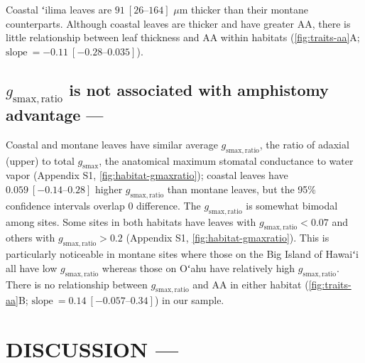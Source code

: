 \documentclass[
  letterpaper,
  DIV=11,
  numbers=noendperiod]{scrartcl}
\begin{document}
Coastal ʻilima leaves are \(91~[\numrange{26}{164}]\) \(\mu\text{m}\)
thicker than their montane counterparts. Although coastal leaves are
thicker and have greater \(\mathrm{AA}\), there is little relationship
between leaf thickness and \(\mathrm{AA}\) within habitats
(\autoref{fig:traits-aa}A;
\(\text{slope}~= -0.11~[\numrange{-0.28}{0.035}]\)).

\hypertarget{g_mathrmsmaxratio-is-not-associated-with-amphistomy-advantage}{%
\subsection{\texorpdfstring{\(g_\mathrm{smax,ratio}\) is not associated
with amphistomy advantage
---}{g\_\textbackslash mathrm\{smax,ratio\} is not associated with amphistomy advantage ---}}\label{g_mathrmsmaxratio-is-not-associated-with-amphistomy-advantage}}

Coastal and montane leaves have similar average
\(g_\mathrm{smax,ratio}\), the ratio of adaxial (upper) to total
\(g_\mathrm{smax}\), the anatomical maximum stomatal conductance to
water vapor (Appendix S1, \autoref{fig:habitat-gmaxratio}); coastal
leaves have \(0.059~[\numrange{-0.14}{0.28}]\) higher
\(g_\mathrm{smax,ratio}\) than montane leaves, but the 95\% confidence
intervals overlap 0 difference. The \(g_\mathrm{smax,ratio}\) is
somewhat bimodal among sites. Some sites in both habitats have leaves
with \(g_\mathrm{smax,ratio} < 0.07\) and others with
\(g_\mathrm{smax,ratio} > 0.2\) (Appendix S1,
\autoref{fig:habitat-gmaxratio}). This is particularly noticeable in
montane sites where those on the Big Island of Hawaiʻi all have low
\(g_\mathrm{smax,ratio}\) whereas those on Oʻahu have relatively high
\(g_\mathrm{smax,ratio}\). There is no relationship between
\(g_\mathrm{smax,ratio}\) and \(\mathrm{AA}\) in either habitat
(\autoref{fig:traits-aa}B;
\(\text{slope}~= 0.14~[\numrange{-0.057}{0.34}]\)) in our sample.

\hypertarget{discussion}{%
\section{DISCUSSION ---}\label{discussion}}
\end{document}
